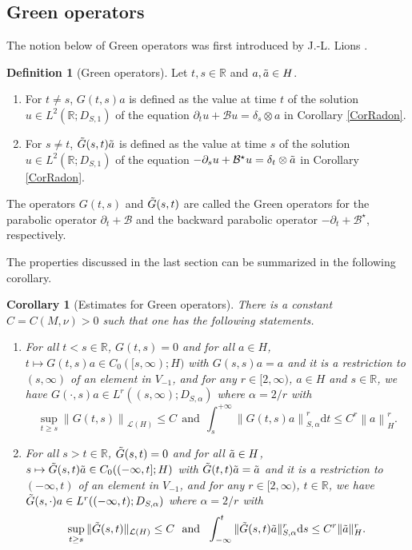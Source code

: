 \documentclass[11pt, letterpaper]{amsart}
\newtheorem{cor}[thm]{Corollary}
\theoremstyle{definition}
\newtheorem{defn}[thm]{Definition}
\theoremstyle{remark}
\numberwithin{equation}{section}
\begin{document}
\subsection{Green operators}\label{S2S6}
The notion below of Green operators was first introduced by J.-L. Lions \cite{lions2013equations}.
\begin{defn}[Green operators]
Let $t,s \in \mathbb{R}$ and $a,\Tilde{a} \in H$.
\begin{enumerate}
    \item For $t \neq s$, $G(t,s)a$ is defined as the value at time $t$ of the solution $u \in L^2(\mathbb{R};D_{S,1})$ of the equation $\partial_t u + \mathcal{B}u = \delta_s \otimes a$ in Corollary \ref{CorRadon}. 
    \item For $s \neq t$, $\Tilde{G}(s,t)\Tilde{a}$ is defined as the value at time $s$ of the solution $u \in L^2(\mathbb{R};D_{S,1})$ of the equation $-\partial_s u + \mathcal{B^\star}u = \delta_t \otimes \Tilde{a}$ in Corollary \ref{CorRadon}. 
\end{enumerate}
The operators $G(t,s)$ and $\Tilde{G}(s,t)$ are called the Green operators for the parabolic operator $\partial_t +\mathcal{B}$ and the backward parabolic operator $ -\partial_t +\mathcal{B^\star}$, respectively.
\end{defn}
 The properties discussed in the last section can be summarized in the following corollary.
\begin{cor}[Estimates for Green operators]\label{Cor Green}  There is a constant $C=C(M,\nu)>0$ such that one has the following statements.
\begin{enumerate}
    \item For all $t<s \in \mathbb{R}$, $G(t,s)=0$ and for all $a \in H$, $t \mapsto G(t,s)a \in C_0([s,\infty);H)$ with $ G(s,s)a =a $ {and it is a restriction to $(s,\infty)$ of an element in $V_{-1}$}, and for any $r \in [2,\infty)$, $a \in H$ and $s\in \mathbb{R}$, we have $G(\cdot,s)a \in L^r((s,\infty);D_{S,\alpha})$ where $\alpha={2}/{r}$ with
    \begin{equation*}
        \sup_{t \geq s} \left \| G(t,s)  \right \|_{\mathcal{L}(H)} \leq C \ \ \mathrm{and} \ \  \int_{s}^{+\infty} \left \| G(t,s)a \right \|^r_{S,\alpha}\mathrm d t \leq C^r \left \| a \right \|_H^r.
    \end{equation*}
    \item For all $s>t \in \mathbb{R}$, $\Tilde{G}(s,t)=0$ and for all $\Tilde{a} \in H$, $s \mapsto \Tilde{G}(s,t)\Tilde{a} \in C_0((-\infty,t];H)$ with $\Tilde{G}(t,t)\Tilde{a} =\Tilde{a}$ {and it is a restriction to $(-\infty,t)$ of an element in $V_{-1}$}, and for any $r \in [2,\infty)$,  $t\in \mathbb{R}$, we have $\Tilde{G}(s,\cdot)a \in L^r((-\infty,t);D_{S,\alpha})$ where $\alpha={2}/{r}$  with 
    \begin{equation*}
       \sup_{t \geq s}  \| \Tilde{G}(s,t)   \|_{\mathcal{L}(H)} \leq C \ \ \mathrm{and} \ \ \int_{-\infty}^{t}  \| \Tilde{G}(s,t)\Tilde{a}  \|^r_{S,\alpha}\mathrm d s \leq C^r \| \Tilde{a}  \|_H^r.
    \end{equation*}
\end{enumerate}
\end{cor}
\end{document}
